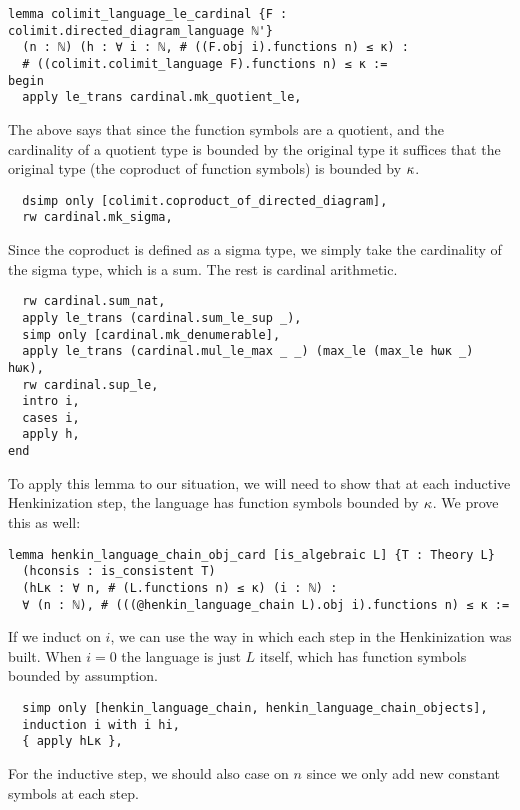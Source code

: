 \begin{lstlisting}
lemma colimit_language_le_cardinal {F : colimit.directed_diagram_language ℕ'}
  (n : ℕ) (h : ∀ i : ℕ, # ((F.obj i).functions n) ≤ κ) :
  # ((colimit.colimit_language F).functions n) ≤ κ :=
begin
  apply le_trans cardinal.mk_quotient_le, \end{lstlisting}

The above says that since the function symbols are a quotient,
and the cardinality of a quotient type is bounded by the original type
it suffices that the original type (the coproduct of function symbols)
is bounded by $\kappa$.

\begin{lstlisting}
  dsimp only [colimit.coproduct_of_directed_diagram],
  rw cardinal.mk_sigma, \end{lstlisting}

Since the coproduct is defined as a sigma type,
we simply take the cardinality of the sigma type,
which is a sum.
The rest is cardinal arithmetic.

\begin{lstlisting}
  rw cardinal.sum_nat,
  apply le_trans (cardinal.sum_le_sup _),
  simp only [cardinal.mk_denumerable],
  apply le_trans (cardinal.mul_le_max _ _) (max_le (max_le hωκ _) hωκ),
  rw cardinal.sup_le,
  intro i,
  cases i,
  apply h,
end
\end{lstlisting}

To apply this lemma to our situation,
we will need to show that at each inductive Henkinization step,
the language has function symbols bounded by $\kappa$.
We prove this as well:

\begin{lstlisting}
lemma henkin_language_chain_obj_card [is_algebraic L] {T : Theory L}
  (hconsis : is_consistent T)
  (hLκ : ∀ n, # (L.functions n) ≤ κ) (i : ℕ) :
  ∀ (n : ℕ), # (((@henkin_language_chain L).obj i).functions n) ≤ κ := \end{lstlisting}

If we induct on $i$,
we can use the way in which each step in the Henkinization was built.
When $i = 0$ the language is just $L$ itself,
which has function symbols bounded by assumption.

\begin{lstlisting}
  simp only [henkin_language_chain, henkin_language_chain_objects],
  induction i with i hi,
  { apply hLκ },
\end{lstlisting}

For the inductive step, we should also case on $n$ since
we only add new constant symbols at each step.

